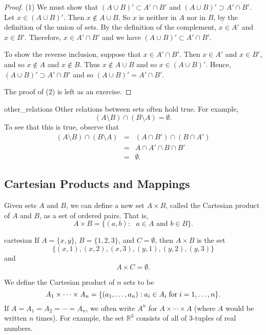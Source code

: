\begin{proof}
(1) 
We must show that $(A \cup B)' \subset A' \cap B'$ and $(A \cup B)' \supset A' \cap B'$. Let $x \in (A \cup B)'$.  Then $x \notin A \cup B$. So $x$ is neither in $A$ nor in $B$, by the definition of the union of sets.  By the definition of the complement, $x \in A'$ and $x \in B'$.  Therefore, $x \in A' \cap B'$ and we have $(A \cup B)' \subset A' \cap B'$.
 
To show the reverse inclusion, suppose that $x \in A' \cap B'$.  Then $x \in A'$ and $x \in B'$, and so $x \notin A$ and $x \notin B$.  Thus $x \notin A \cup B$ and so $x \in (A \cup B)'$.  Hence, $(A \cup B)' \supset A' \cap B'$ and so $(A \cup B)' = A' \cap B'$. 

The proof of (2) is left as an exercise.
\end{proof}
 
\medskip
 
\begin{example}{other_relations}
Other relations between sets often hold true.  For example,
$$
( A \setminus B) \cap (B \setminus A) = \emptyset.
$$
To see that this is true, observe that
\begin{eqnarray*}
( A \setminus B) \cap (B \setminus A)
& = &
( A \cap B') \cap (B \cap A') \\
& = &
A \cap A' \cap B \cap B' \\
& = & \emptyset.
\end{eqnarray*}
\end{example}
 
 
\subsection*{Cartesian Products and Mappings}

Given sets $A$ and $B$, we can define a new set $A \times\label{sets_cartesian} B$, called the {\bfi Cartesian product\/}  of $A$ and $B$, as a set of ordered pairs.  That is, 
$$
A \times B = \{ (a,b) : \mbox{ $a \in A$ and $b \in B$} \}.
$$
 
\medskip
 
\begin{example}{cartesian}
If $A = \{ x, y \}$, $B = \{ 1, 2, 3 \}$, and $C = \emptyset$, then $A \times B$ is the set 
$$
\{ (x, 1), (x, 2), (x, 3), (y, 1), (y, 2), (y, 3) \}
$$
and
$$
A \times C = \emptyset.
$$
\end{example}

We define the {\bfi Cartesian product of $n$ sets\/} to be
$$
A_1 \times \cdots \times A_n = \{ (a_1, \ldots, a_n): a_i \in A_i {\rm\; for\;} i = 1, \ldots, n \}.
$$
If $A = A_1 = A_2 = \cdots = A_n$, we often write $A^n$ for $A \times \cdots \times A$ (where $A$ would be written $n$ times)\label{sets_ncartesian}.   For example, the set ${\mathbb R}^3$ consists of all of 3-tuples of real numbers.
 
